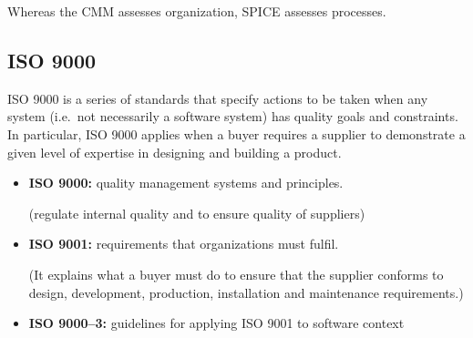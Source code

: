 Whereas the CMM assesses organization, SPICE assesses processes.

\subsection{ISO 9000}

ISO 9000 is a series of standards that specify actions to be taken when any
system (i.e.\ not necessarily a software system) has quality goals and
constraints. In particular, ISO 9000 applies when a buyer requires a supplier
to demonstrate a given level of expertise in designing and building a product.

\begin{itemize}
    \item \textbf{ISO 9000:} quality management systems and principles.

        (regulate internal quality and to ensure quality of suppliers)

    \item \textbf{ISO 9001:} requirements that organizations must fulfil.

        (It explains what a buyer must do to ensure that the supplier conforms to
        design, development, production, installation and maintenance requirements.)

    \item \textbf{ISO 9000--3:} guidelines for applying ISO 9001 to
        software context
\end{itemize}

